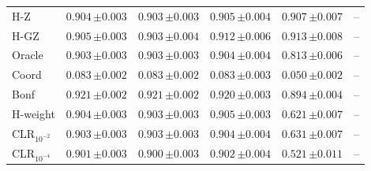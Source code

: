\begin{tabular}{lccccc}
H-Z & $0.904\,{\scriptstyle\pm 0.003}$ & $0.903\,{\scriptstyle\pm 0.003}$ & $0.905\,{\scriptstyle\pm 0.004}$ & $0.907\,{\scriptstyle\pm 0.007}$ & -- \\
H-GZ & $0.905\,{\scriptstyle\pm 0.003}$ & $0.903\,{\scriptstyle\pm 0.004}$ & $0.912\,{\scriptstyle\pm 0.006}$ & $0.913\,{\scriptstyle\pm 0.008}$ & -- \\
Oracle & $0.903\,{\scriptstyle\pm 0.003}$ & $0.903\,{\scriptstyle\pm 0.003}$ & $0.904\,{\scriptstyle\pm 0.004}$ & $0.813\,{\scriptstyle\pm 0.006}$ & -- \\
Coord & $0.083\,{\scriptstyle\pm 0.002}$ & $0.083\,{\scriptstyle\pm 0.002}$ & $0.083\,{\scriptstyle\pm 0.003}$ & $0.050\,{\scriptstyle\pm 0.002}$ & -- \\
Bonf & $0.921\,{\scriptstyle\pm 0.002}$ & $0.921\,{\scriptstyle\pm 0.002}$ & $0.920\,{\scriptstyle\pm 0.003}$ & $0.894\,{\scriptstyle\pm 0.004}$ & -- \\
H-weight & $0.904\,{\scriptstyle\pm 0.003}$ & $0.903\,{\scriptstyle\pm 0.003}$ & $0.905\,{\scriptstyle\pm 0.003}$ & $0.621\,{\scriptstyle\pm 0.007}$ & -- \\
CLR$_{10^{-2}}$ & $0.903\,{\scriptstyle\pm 0.003}$ & $0.903\,{\scriptstyle\pm 0.003}$ & $0.904\,{\scriptstyle\pm 0.004}$ & $0.631\,{\scriptstyle\pm 0.007}$ & -- \\
CLR$_{10^{-4}}$ & $0.901\,{\scriptstyle\pm 0.003}$ & $0.900\,{\scriptstyle\pm 0.003}$ & $0.902\,{\scriptstyle\pm 0.004}$ & $0.521\,{\scriptstyle\pm 0.011}$ & -- \\
\bottomrule
\end{tabular}

